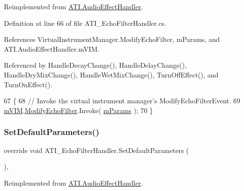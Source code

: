 Reimplemented from \hyperlink{class_a_t_i_1_1_audio_effect_handler_aab43cfccb835b9630456eb4590626e6d}{A\+T\+I.\+Audio\+Effect\+Handler}.



Definition at line 66 of file A\+T\+I\+\_\+\+Echo\+Filter\+Handler.\+cs.



References Virtual\+Instrument\+Manager.\+Modify\+Echo\+Filter, m\+Params, and A\+T\+I.\+Audio\+Effect\+Handler.\+m\+V\+IM.



Referenced by Handle\+Decay\+Change(), Handle\+Delay\+Change(), Handle\+Dry\+Mix\+Change(), Handle\+Wet\+Mix\+Change(), Turn\+Off\+Effect(), and Turn\+On\+Effect().


\begin{DoxyCode}
67     \{
68         \textcolor{comment}{// Invoke the virtual instrument manager's ModifyEchoFilterEvent.}
69         \hyperlink{class_a_t_i_1_1_audio_effect_handler_a6b5b6149cc376ff0f750ade08ba23bce}{mVIM}.\hyperlink{group___v_i_m_events_ga112ed15f48fd261f1ad71c3c953c0a58}{ModifyEchoFilter}.Invoke( \hyperlink{class_a_t_i___echo_filter_handler_afe435170679cf364951083e6f6ffab36}{mParams} );
70     \}
\end{DoxyCode}
\mbox{\label{class_a_t_i___echo_filter_handler_a55aed0339fe1f3cdbea2b810a2d74cd4}} 
\subsubsection{\texorpdfstring{Set\+Default\+Parameters()}{SetDefaultParameters()}}
{\footnotesize\ttfamily override void A\+T\+I\+\_\+\+Echo\+Filter\+Handler.\+Set\+Default\+Parameters (\begin{DoxyParamCaption}{ }\end{DoxyParamCaption})\hspace{0.3cm}{\ttfamily [protected]}, {\ttfamily [virtual]}}



Reimplemented from \hyperlink{class_a_t_i_1_1_audio_effect_handler_a9f2b5ce4ce7b2e3a7cca147a87733a77}{A\+T\+I.\+Audio\+Effect\+Handler}.



